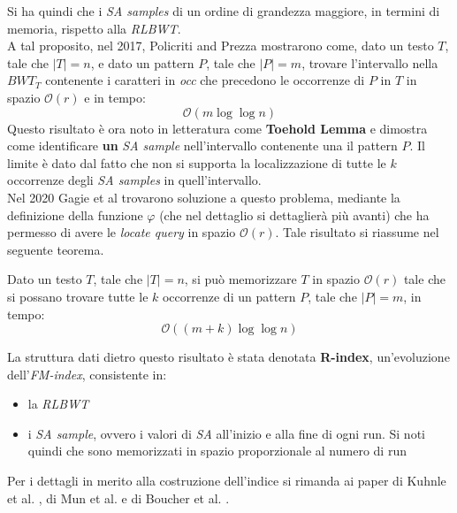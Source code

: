Si ha quindi che i \textit{SA samples} di un ordine di grandezza maggiore, in
termini di memoria, rispetto alla \textit{RLBWT}.\\
A tal proposito, nel 2017, Policriti and Prezza \cite{policriti} mostrarono
come, dato un testo $T$, tale che $|T|=n$, e dato un pattern $P$, tale
che $|P|=m$, trovare l'intervallo nella $BWT_T$ contenente i caratteri in
\textit{occ} che precedono le occorrenze di $P$ in $T$ in spazio
$\mathcal{O}(r)$ e in tempo:
\[\mathcal{O}(m\log\log n)\]
Questo risultato è ora noto in letteratura come \textbf{Toehold Lemma} e
dimostra come identificare \textbf{un} \textit{SA sample} nell'intervallo
contenente una il pattern $P$. Il limite è dato dal fatto che non si supporta la
localizzazione di tutte le $k$ occorrenze degli \textit{SA samples} in
quell'intervallo.\\
Nel 2020 Gagie et al \cite{gagie2020} trovarono soluzione a questo problema,
mediante la definizione della funzione $\varphi$ (che nel dettaglio si
dettaglierà più avanti) che ha permesso di avere le \textit{locate query} in
spazio $\mathcal{O}(r)$. Tale risultato si riassume nel seguente teorema.
\begin{teorema}
  Dato un testo $T$, tale che $|T|=n$, si può memorizzare $T$ in spazio
  $\mathcal{O}(r)$ tale che si possano trovare tutte le $k$ occorrenze di un
  pattern $P$, tale che $|P|=m$, in tempo:
  \[\mathcal{O}((m+k)\log\log n)\]
\end{teorema}
La struttura dati dietro questo risultato è stata denotata \textbf{R-index},
un'evoluzione dell'\textit{FM-index}, consistente in:
\begin{itemize}
  \item la \textit{RLBWT}
  \item i \textit{SA sample}, ovvero i valori di \textit{SA} all'inizio e alla
  fine di ogni run. Si noti quindi che sono memorizzati in spazio proporzionale
  al numero di run
\end{itemize}
Per i dettagli in merito alla costruzione dell'indice si rimanda ai paper di
Kuhnle et al. \cite{kuhnle}, di Mun et al. \cite{mun} e di Boucher et
al. \cite{boucher}. 
